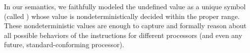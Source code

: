 In our semantics, we faithfully modeled the undefined value as a unique symbol (called ) whose value is nondeterministically decided within the proper range.
These nondeterministic values are enough to capture and formally reason about all possible behaviors of the instructions for different processors (and even any future, standard-conforming processor).






%













